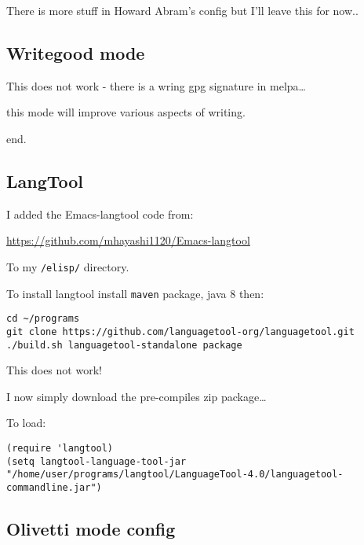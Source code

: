 \documentclass[12pt]{article}
\begin{document}
There is more stuff in Howard Abram's config but I'll leave this for now..


\subsection{Writegood mode}
\label{sec:org41218a6}
This does not work - there is a wring gpg signature in melpa\ldots{}

this mode will improve various aspects of writing.

end.

\subsection{LangTool}
\label{sec:org9638c21}

I added the Emacs-langtool code from:

\url{https://github.com/mhayashi1120/Emacs-langtool}

To my \texttt{/elisp/} directory.

To install langtool install \texttt{maven} package, java 8 then:

\begin{verbatim}
cd ~/programs
git clone https://github.com/languagetool-org/languagetool.git
./build.sh languagetool-standalone package

\end{verbatim}
This does not work!

I now simply download the pre-compiles zip package\ldots{}

To load:
\begin{verbatim}
(require 'langtool)
(setq langtool-language-tool-jar "/home/user/programs/langtool/LanguageTool-4.0/languagetool-commandline.jar")
\end{verbatim}

\subsection{Olivetti mode config}
\label{sec:org2bebb3e}
\end{document}
